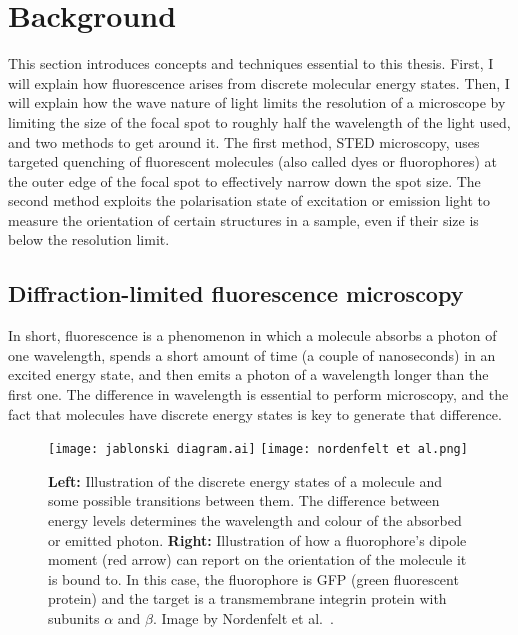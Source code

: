 \chapter{Background}

This section introduces concepts and techniques essential to this thesis. First, I will explain how fluorescence arises from discrete molecular energy states. Then, I will explain how the wave nature of light limits the resolution of a microscope by limiting the size of the focal spot to roughly half the wavelength of the light used, and two methods to get around it. The first method, STED microscopy, uses targeted quenching of fluorescent molecules (also called dyes or fluorophores) at the outer edge of the focal spot to effectively narrow down the spot size. The second method exploits the polarisation state of excitation or emission light to measure the orientation of certain structures in a sample, even if their size is below the resolution limit.

\section{Diffraction-limited fluorescence microscopy}

In short, fluorescence is a phenomenon in which a molecule absorbs a photon of one wavelength, spends a short amount of time (a couple of nanoseconds) in an excited energy state, and then emits a photon of a wavelength longer than the first one. The difference in wavelength is essential to perform microscopy, and the fact that molecules have discrete energy states is key  to generate that difference.

\begin{figure}
	\centering
	 \texttt{[image: jablonski diagram.ai]} \hfill \texttt{[image: nordenfelt et al.png]}
	\caption{
		\textbf{Left:} Illustration of the discrete energy states of a molecule and some possible transitions between them. The difference between energy levels determines the wavelength and colour of the absorbed or emitted photon. \textbf{Right:} Illustration of how a fluorophore's dipole moment (red arrow) can report on the orientation of the molecule it is bound to. In this case, the fluorophore is GFP (green fluorescent protein) and the target is a transmembrane integrin protein with subunits $ \alpha $ and $ \beta $. Image by Nordenfelt et al.~\cite{Nordenfelt2017}.
	}
	\label{fig:jablonski}
\end{figure}

